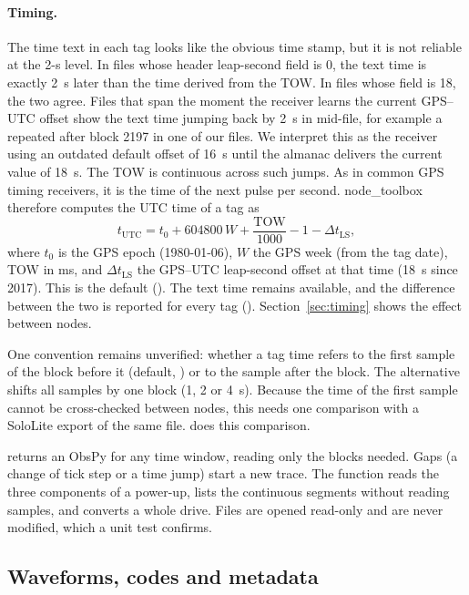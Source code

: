 \documentclass[report]{seismica}
\begin{document}
\paragraph{Timing.} The time text in each tag looks like the obvious time stamp, but it is not reliable at the 2-s level. In files whose header leap-second field is 0, the text time is exactly 2~s later than the time derived from the TOW. In files whose field is 18, the two agree. Files that span the moment the receiver learns the current GPS--UTC offset show the text time jumping back by 2~s in mid-file, for example a repeated  after block 2197 in one of our files. We interpret this as the receiver using an outdated default offset of 16~s until the almanac delivers the current value of 18~s. The TOW is continuous across such jumps. As in common GPS timing receivers, it is the time of the next pulse per second. node\_toolbox therefore computes the UTC time of a tag as
\begin{equation}\label{eq:tow}
t_\mathrm{UTC} = t_0 + 604800\,W + \frac{\mathrm{TOW}}{1000} - 1 - \Delta t_\mathrm{LS},
\end{equation}
where $t_0$ is the GPS epoch (1980-01-06), $W$ the GPS week (from the tag date), TOW in ms, and $\Delta t_\mathrm{LS}$ the GPS--UTC leap-second offset at that time (18~s since 2017). This is the default (). The text time remains available, and the difference between the two is reported for every tag (). Section~\ref{sec:timing} shows the effect between nodes.

One convention remains unverified: whether a tag time refers to the first sample of the block before it (default, ) or to the sample after the block. The alternative shifts all samples by one block (1, 2 or 4~s). Because the time of the first sample cannot be cross-checked between nodes, this needs one comparison with a SoloLite export of the same file.  does this comparison.

 returns an ObsPy  for any time window, reading only the blocks needed. Gaps (a change of tick step or a time jump) start a new trace. The function  reads the three components of a power-up,  lists the continuous segments without reading samples, and  converts a whole drive. Files are opened read-only and are never modified, which a unit test confirms.

\subsection{Waveforms, codes and metadata}
\end{document}
